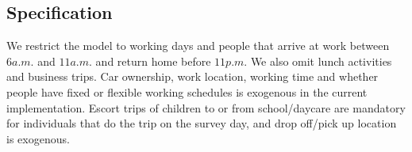 %
%
%



%

\subsection{Specification}
We restrict the model to working days and people that arrive at work between $6\unit{a.m.}$ and $11\unit{a.m.}$ and return home before $11\unit{p.m}$. We also omit lunch activities and business trips. Car ownership, work location, working time and whether people have fixed or flexible working schedules is exogenous in the current implementation. Escort trips of children to or from school/daycare are mandatory for individuals that do the trip on the survey day, and drop off/pick up location is exogenous. 

